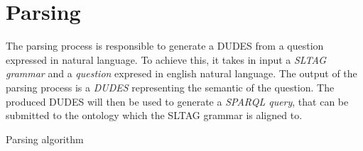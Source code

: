 \section{Parsing}
\label{sec:parsing}

The parsing process is responsible to generate a DUDES from a question expressed in natural language. 
%
To achieve this, it takes in input a \textit{SLTAG grammar} and a \textit{question} expresed in english natural language.
The output of the parsing process is a \textit{DUDES} representing the semantic of the question.
%
The produced DUDES will then be used to generate a \textit{SPARQL query}, that can be submitted to the ontology which the SLTAG grammar is aligned to.
%

\begin{algorithm}[t]

 {
	
	
	
	
	
}

\caption{Parsing algorithm}
\label{alg:parsing}
\end{algorithm}

